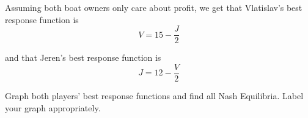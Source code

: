 \documentclass[addpoints]{exam}
\begin{document}
\begin{questions}
\begin{parts}
Assuming both boat owners only care about profit, 
we get that Vlatislav's best response function is
  $$ V = 15 - \frac{J}{2} $$

and that Jeren's best response function is
$$ J = 12 - \frac{V}{2}$$ 

Graph both players' best response functions 
and find all Nash Equilibria.
Label your graph appropriately.

\vspace{10mm}

\newpage

\end{parts}




\end{questions}
\end{document}
